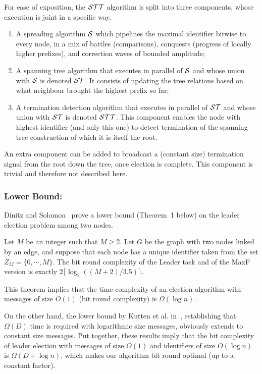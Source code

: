 \documentclass[11pt,envcountsame,letterpaper]{llncs}
\begin{document}
For ease of exposition, the $\cal STT$ algorithm is split into three components, whose execution is joint in a specific way.

\begin{enumerate}
\item A spreading algorithm $\cal S$ which pipelines the maximal identifier bitwise to every node, in a mix of battles (comparisons), conquests (progress of locally higher prefixes), and correction waves of bounded amplitude;
\item A spanning tree algorithm that executes in parallel of $\cal S$ and whose union with $\cal S$ is denoted $\cal ST$. It consists of updating the tree relations based on what neighbour brought the highest prefix so far;
\item A termination detection algorithm that executes in parallel of $\cal ST$ and whose union with $\cal ST$ is denoted $\cal STT$. This component enables the node with highest identifier (and only this one) to detect termination of
the spanning tree construction of which it is itself the root.
\end{enumerate}

An extra component can be added to broadcast a (constant size) termination signal from the root down the tree, once election is complete. This component is trivial and therefore not described here.

\subsubsection{Lower Bound:}

Dinitz and Solomon~\cite{DS07} prove a lower bound (Theorem~1 below) on the leader election problem among two nodes.
\begin{theorem}[\cite{DS07}]
Let $M$ be an integer such that $M\geq 2$.
Let $G$ be the graph with two nodes linked by an edge, and suppose that each node
has a unique identifier taken from the set $Z_M=\{0,\cdots, M\}$. The bit
round complexity
of the Leader task and of the MaxF version is exactly 
$2\lceil \log_2((M+2)/3.5)\rceil$.
\end{theorem}
This theorem implies that  the time complexity of an election algorithm with
messages of size $O(1)$ (bit round complexity) is $\Omega(\log n)$.


On the other hand, the lower bound by Kutten et al. in~\cite{KPPRT15}, establishing that $\Omega(D)$ time is required with logarithmic size messages, obviously extends to constant size messages. Put together, these results imply that the bit  complexity of leader election
with messages of size $O(1)$ and identifiers of size $O(\log n)$ is $\Omega(D+\log n)$, which makes our algorithm bit round optimal (up to a constant factor).
\end{document}
